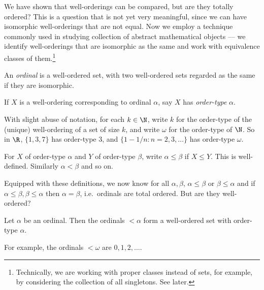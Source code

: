 \documentclass[a4paper]{article}
\begin{document}
We have shown that well-orderings can be compared, but are they totally ordered? This is a question that is not yet very meaningful, since we can have isomorphic well-orderings that are not equal. Now we employ a technique commonly used in studying collection of abstract mathematical objects --- we identify well-orderings that are isomorphic as the same and work with equivalence classes of them.\footnote{Technically, we are working with proper classes instead of sets, for example, by considering the collection of all singletons. See later.}

\begin{definition}[Ordinal]
  An \emph{ordinal} is a well-ordered set, with two well-ordered sets regarded as the same if they are isomorphic.
\end{definition}

\begin{definition}
  If \(X\) is a well-ordering corresponding to ordinal \(\alpha\), say \(X\) has \emph{order-type} \(\alpha\).
\end{definition}

\begin{eg}
  With slight abuse of notation, for each \(k \in \N\), write \(k\) for the order-type of the (unique) well-ordering of a set of size \(k\), and write \(\omega\) for the order-type of \(\N\). So in \(\R\), \(\{1, 3, 7\}\) has order-type \(3\), and \(\{1 - 1/n: n = 2, 3, \dots\}\) has order-type \(\omega\).
\end{eg}

\begin{notation}
  For \(X\) of order-type \(\alpha\) and \(Y\) of order-type \(\beta\), write \(\alpha \leq \beta\) if \(X \leq Y\). This is well-defined. Similarly \(\alpha < \beta\) and so on.
\end{notation}

Equipped with these definitions, we now know for all \(\alpha, \beta\), \(\alpha \leq \beta\) or \(\beta \leq \alpha\) and if \(\alpha \leq \beta, \beta \leq \alpha\) then \(\alpha = \beta\), i.e.\ ordinals are total ordered. But are they well-ordered?

\begin{theorem}
  Let \(\alpha\) be an ordinal. Then the ordinals \(< \alpha\) form a well-ordered set with order-type \(\alpha\).
\end{theorem}

For example, the ordinals \(< \omega\) are \(0, 1, 2, \dots\).
\end{document}
